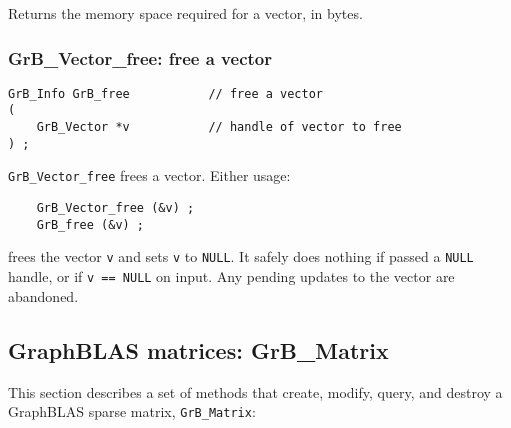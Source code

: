 \documentclass[12pt]{article}
\begin{document}
Returns the memory space required for a vector, in bytes.

\subsubsection{{\sf GrB\_Vector\_free:}          free a vector}
\label{vector_free}

\begin{mdframed}[userdefinedwidth=6in]
{\footnotesize
\begin{verbatim}
GrB_Info GrB_free           // free a vector
(
    GrB_Vector *v           // handle of vector to free
) ;
\end{verbatim}
} \end{mdframed}

\verb'GrB_Vector_free' frees a vector.  Either usage:

    {\small
    \begin{verbatim}
    GrB_Vector_free (&v) ;
    GrB_free (&v) ; \end{verbatim}}

\noindent
frees the vector \verb'v' and sets \verb'v' to \verb'NULL'.  It safely does
nothing if passed a \verb'NULL' handle, or if \verb'v == NULL' on input.  Any
pending updates to the vector are abandoned.

\newpage
\subsection{GraphBLAS matrices: {\sf GrB\_Matrix}} %
\label{matrix}

This section describes a set of methods that create, modify, query,
and destroy a GraphBLAS sparse matrix, \verb'GrB_Matrix':
\end{document}

